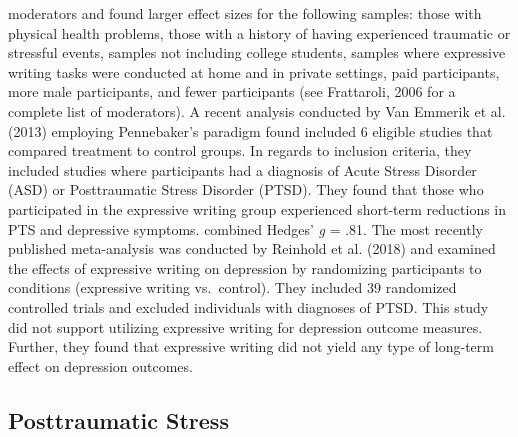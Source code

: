 \documentclass[english,man, mask]{apa6}
\theoremstyle{definition}
\theoremstyle{definition}
\theoremstyle{definition}
\theoremstyle{remark}
\begin{document}
moderators and found larger effect sizes for the following samples:
those with physical health problems, those with a history of having
experienced traumatic or stressful events, samples not including college
students, samples where expressive writing tasks were conducted at home
and in private settings, paid participants, more male participants, and
fewer participants (see Frattaroli, 2006 for a complete list of
moderators). A recent analysis conducted by Van Emmerik et al. (2013)
employing Pennebaker's paradigm found included 6 eligible studies that
compared treatment to control groups. In regards to inclusion criteria,
they included studies where participants had a diagnosis of Acute Stress
Disorder (ASD) or Posttraumatic Stress Disorder (PTSD). They found that
those who participated in the expressive writing group experienced
short-term reductions in PTS and depressive symptoms. combined Hedges'
\emph{g} = .81. The most recently published meta-analysis was conducted
by Reinhold et al. (2018) and examined the effects of expressive writing
on depression by randomizing participants to conditions (expressive
writing vs.~control). They included 39 randomized controlled trials and
excluded individuals with diagnoses of PTSD. This study did not support
utilizing expressive writing for depression outcome measures. Further,
they found that expressive writing did not yield any type of long-term
effect on depression outcomes.

\subsection{Posttraumatic Stress}\label{posttraumatic-stress}
\end{document}
